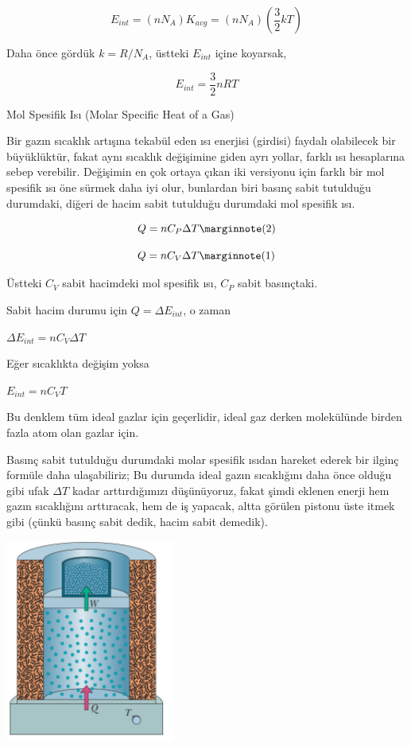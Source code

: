 \documentclass[12pt,fleqn]{article}\usepackage{../../common}
\begin{document}
$$
E_{int} = (n N_A) K_{avg} = (n N_A) (\frac{3}{2} k T)
$$

Daha önce gördük $k = R/N_A$, üstteki $E_{int}$ içine koyarsak,

$$
E_{int} = \frac{3}{2} n R T
$$

Mol Spesifik Isı (Molar Specific Heat of a Gas)

Bir gazın sıcaklık artışına tekabül eden ısı enerjisi (girdisi) faydalı
olabilecek bir büyüklüktür, fakat aynı sıcaklık değişimine giden ayrı yollar,
farklı ısı hesaplarına sebep verebilir. Değişimin en çok ortaya çıkan iki
versiyonu için farklı bir mol spesifik ısı öne sürmek daha iyi olur, bunlardan
biri basınç sabit tutulduğu durumdaki, diğeri de hacim sabit tutulduğu
durumdaki mol spesifik ısı.

$$
Q = n C_P \Delta T
\mlabel{2}
$$

$$
Q = n C_V \Delta T
\mlabel{1}
$$

Üstteki $C_V$ sabit hacimdeki mol spesifik ısı, $C_P$ sabit basınçtaki.

Sabit hacim durumu için $Q = \Delta E_{int}$, o zaman 

$\Delta E_{int} = n C_V \Delta T$

Eğer sıcaklıkta değişim yoksa 

$E_{int} = n C_V T$

Bu denklem tüm ideal gazlar için geçerlidir, ideal gaz derken molekülünde birden
fazla atom olan gazlar için.

Basınç sabit tutulduğu durumdaki molar spesifik ısıdan hareket ederek bir ilginç
formüle daha ulaşabiliriz; Bu durumda ideal gazın sıcaklığını daha önce olduğu
gibi ufak $\Delta T$ kadar arttırdığımızı düşünüyoruz, fakat şimdi eklenen
enerji hem gazın sıcaklığını arttıracak, hem de iş yapacak, altta görülen
pistonu üste itmek gibi (çünkü basınç sabit dedik, hacim sabit demedik). 

\includegraphics[width=15em]{phy_005_basics_06.png}
\end{document}
